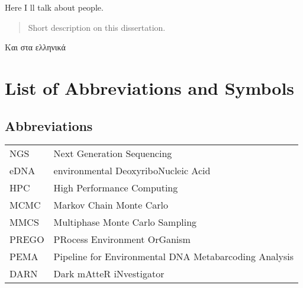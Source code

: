 \documentclass[master=elt, cleveref, autoref, masteroption=eg]{kulemt}
\begin{document}
\begin{preface}
  
   Here I ll talk about people.    
  
\end{preface}


\tableofcontents


\begin{abstract}

   Short description on this dissertation.

\end{abstract}


\begin{abstract*}

   Και στα ελληνικά
   
\end{abstract*}

\listoffiguresandtables

\chapter{List of Abbreviations and Symbols}

\section*{Abbreviations}
\begin{flushleft}
  \renewcommand{\arraystretch}{1.1}
  \begin{tabularx}{\textwidth}{@{}p{12mm}X@{}}
    NGS   & Next Generation Sequencing \\
    eDNA  & environmental DeoxyriboNucleic Acid \\
    HPC   & High Performance Computing \\
    MCMC  & Markov Chain Monte Carlo \\
    MMCS  & Multiphase Monte Carlo Sampling \\
    PREGO & PRocess Environment OrGanism \\
    PEMA  & Pipeline for Environmental DNA Metabarcoding Analysis \\
    DARN  & Dark mAtteR iNvestigator \\
    
  \end{tabularx}
\end{flushleft}
\end{document}
